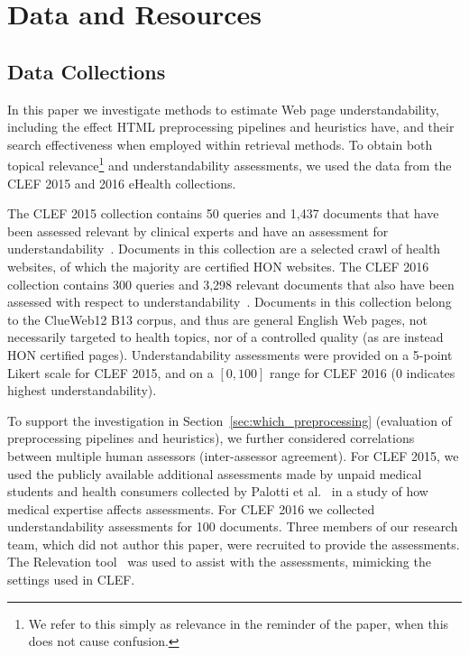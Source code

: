 \section{Data and Resources}
\label{sec:data}

\subsection{Data Collections}

In this paper we investigate methods to estimate Web page understandability, including the effect HTML preprocessing pipelines and heuristics have, and their search effectiveness when employed within retrieval methods. To obtain both topical relevance\footnote{We refer to this simply as relevance in the reminder of the paper, when this does not cause confusion.} and  understandability assessments, we used the data from the CLEF 2015 and 2016 eHealth collections. 

The CLEF 2015 collection contains 50 queries and 1,437 documents that have been assessed relevant by clinical experts and have an assessment for understandability~\cite{clef15}. Documents in this collection are a selected crawl of health websites, of which the majority are certified HON websites.
The CLEF 2016 collection contains 300 queries and 3,298 relevant documents that also have been assessed with respect to understandability~\cite{clef16}. Documents in this collection belong to the ClueWeb12 B13 corpus, and thus are general English Web pages, not necessarily targeted to health topics, nor of a controlled quality (as are instead HON certified pages). 
Understandability assessments were provided on a 5-point Likert scale for CLEF 2015, and on a $[0,100]$ range for CLEF 2016 (0 indicates highest understandability). 

To support the investigation in Section~\ref{sec:which_preprocessing} (evaluation of preprocessing pipelines and heuristics), we further considered correlations between multiple human assessors (inter-assessor agreement). For CLEF 2015, we used the publicly available additional assessments made by unpaid medical students and health consumers collected by Palotti et al.~\cite{palotti16b} in a study of how medical expertise affects assessments. For CLEF 2016 we  collected understandability assessments for 100 documents. Three members of our research team, which did not author this paper, were recruited to provide the assessments. The Relevation tool~\cite{koopman14} was used to assist with the assessments, mimicking the settings used in CLEF.


